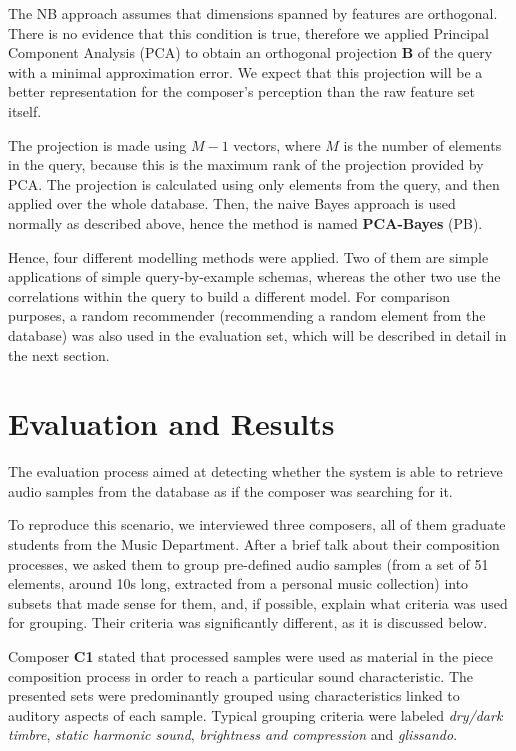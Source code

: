 \documentclass{article}
\begin{document}
The NB approach assumes that dimensions spanned by features are
orthogonal. There is no
evidence that this condition is true, therefore we applied Principal
Component Analysis (PCA) to obtain an orthogonal projection
$\boldsymbol B$ of the query with a minimal approximation error. We
expect that this projection will be a better representation for the
composer's perception than the raw feature set itself.

The projection is made using $M-1$ vectors, where $M$ is the number of
elements in the query, because this is the maximum rank of the
projection provided by PCA. The projection is calculated using only
elements from the query, and then applied over the whole
database. Then, the naive Bayes approach is used normally as described
above, hence the method is named \textbf{PCA-Bayes} (PB).

Hence, four different modelling methods were applied. Two of them are simple
applications of simple query-by-example schemas, whereas the other two
use the correlations within the query to build a different model. For
comparison purposes, a random recommender (recommending a random
element from the database) was also used in the evaluation set, which
will be described in detail in the next section.

\section{Evaluation and Results}\label{sec:evaluation}
The evaluation process aimed at detecting whether the system is able
to retrieve audio samples from the database as if the composer was
searching for it.

To reproduce this scenario, we interviewed three
composers, all of them graduate students from the Music
Department. After a brief talk about their composition processes, we
asked them to group pre-defined audio samples (from a set of 51
elements, around 10s long, extracted from a personal music collection)
into subsets that made sense for them, and, if possible, explain what
criteria was used for grouping. Their criteria was significantly
different, as it is discussed below.

Composer \textbf{C1} stated that processed samples were used as
material in the piece composition process in order to reach a
particular sound characteristic. The
presented sets were predominantly grouped using characteristics linked
to auditory aspects of each sample. Typical grouping criteria were
labeled \textit{dry/dark timbre}, \textit{static harmonic sound},
\textit{brightness and compression} and \textit{glissando}. 
\end{document}
